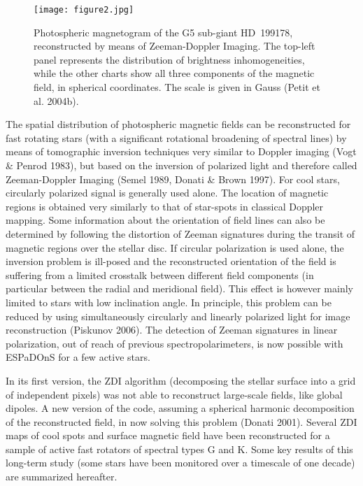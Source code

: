 \documentclass[11pt,twoside]{article}
\begin{document}
\begin{figure}[t]
   \centering
   \texttt{[image: figure2.jpg]}
   \caption{Photospheric magnetogram of the G5 sub-giant HD~199178, reconstructed by means of Zeeman-Doppler Imaging. The top-left panel represents the distribution of brightness inhomogeneities, while the other charts show all three components of the magnetic field, in spherical coordinates. The scale is given in Gauss (Petit et al. 2004b).}
   \label{fig:hd199178}
\end{figure}

The spatial distribution of photospheric magnetic fields can be reconstructed for fast rotating stars (with a significant rotational broadening of spectral lines) by means of tomographic inversion techniques very similar to Doppler imaging (Vogt \& Penrod 1983), but based on the inversion of polarized light and therefore called Zeeman-Doppler Imaging (Semel 1989, Donati \& Brown 1997). For cool stars, circularly polarized signal is generally used alone. The location of magnetic regions is obtained very similarly to that of star-spots in classical Doppler mapping. Some information about the orientation of field lines can also be determined by following the distortion of Zeeman signatures during the transit of magnetic regions over the stellar disc. If circular polarization is used alone, the inversion problem is ill-posed and the reconstructed orientation of the field is suffering from a limited crosstalk between different field components (in particular between the radial and meridional field). This effect is however mainly limited to stars with low inclination angle. In principle, this problem can be reduced by using simultaneously circularly and linearly polarized light for image reconstruction (Piskunov 2006). The detection of Zeeman signatures in linear polarization, out of reach of previous spectropolarimeters, is now possible with ESPaDOnS for a few active stars. 

In its first version, the ZDI algorithm (decomposing the stellar surface into a grid of independent pixels) was not able to reconstruct large-scale fields, like global dipoles. A new version of the code, assuming a spherical harmonic decomposition of the reconstructed field, in now solving this problem (Donati 2001). Several ZDI maps of cool spots and surface magnetic field have been reconstructed for a sample of active fast rotators of spectral types G and K. Some key results of this long-term study (some stars have been monitored over a timescale of one decade) are summarized hereafter.
\end{document}
